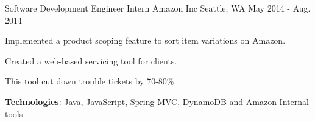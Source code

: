 \begin{cventries}
{\begin{cvitems}
      \end{cvitems}
    }
    {}
    {}
  \cventry
    {Software Development Engineer Intern}
    {Amazon Inc}
    {Seattle, WA}
    {May 2014 - Aug. 2014}
    {
      \begin{cvitems}
        \item {Implemented a product scoping feature to sort item variations on Amazon.}
        \item {Created a web-based servicing tool for clients.}
        \item {This tool cut down trouble tickets by 70-80\%.}
        \item {\textbf{Technologies}: Java, JavaScript, Spring MVC, DynamoDB and Amazon Internal tools}
      \end{cvitems} 
    }
    {}
    {}
\end{cventries}